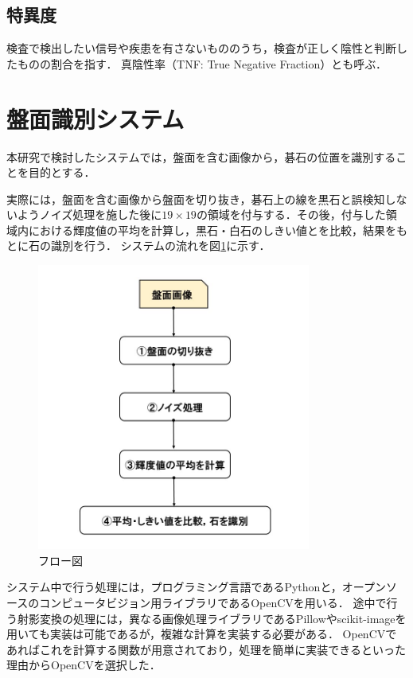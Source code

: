 \documentclass[openright]{nitocs}
\numberwithin{equation}{section}
\begin{document}
        \subsection{特異度} %
        検査で検出したい信号や疾患を有さないもののうち，検査が正しく陰性と判断したものの割合を指す．
        真陰性率（TNF: True Negative Fraction）とも呼ぶ．

    \section{盤面識別システム} %
    \label{system}
        本研究で検討したシステムでは，盤面を含む画像から，碁石の位置を識別することを目的とする．

        実際には，盤面を含む画像から盤面を切り抜き，碁石上の線を黒石と誤検知しないようノイズ処理を施した後に$19\times19$の領域を付与する．その後，付与した領域内における輝度値の平均を計算し，黒石・白石のしきい値とを比較，結果をもとに石の識別を行う．
        システムの流れを図\ref{flow}に示す．
        \begin{figure}[tb] %
            \begin{center}
            \includegraphics[clip,width=90mm]{flow.jpg} 
            \caption{フロー図}
            \label{flow}
            \end{center}
        \end{figure}

        システム中で行う処理には，プログラミング言語であるPythonと，オープンソースのコンピュータビジョン用ライブラリであるOpenCVを用いる．
        途中で行う射影変換の処理には，異なる画像処理ライブラリであるPillowやscikit-imageを用いても実装は可能であるが，複雑な計算を実装する必要がある．
        OpenCVであればこれを計算する関数が用意されており，処理を簡単に実装できるといった理由からOpenCVを選択した．
\end{document}
